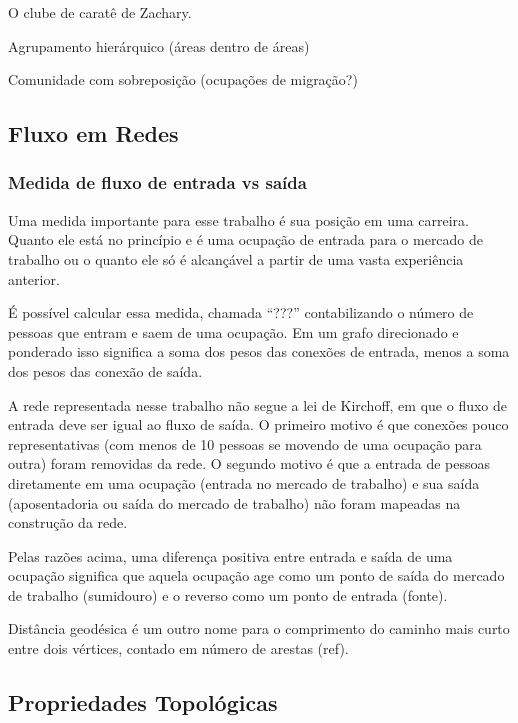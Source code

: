 \documentclass[12pt,a4paper]{article}
\theoremstyle{hypo}
\begin{document}
O clube de caratê de Zachary.

Agrupamento hierárquico (áreas dentro de áreas)

Comunidade com sobreposição (ocupações de migração?)


\subsection{Fluxo em Redes}

\subsubsection{Medida de fluxo de entrada vs saída}


Uma medida importante para esse trabalho é sua posição em uma carreira. Quanto ele está no princípio e é uma ocupação de entrada para o mercado de trabalho ou o quanto ele só é alcançável a partir de uma vasta experiência anterior.

É possível calcular essa medida, chamada \enquote{???} contabilizando o número de pessoas que entram e saem de uma ocupação. Em um grafo direcionado e ponderado isso significa a soma dos pesos das conexões de entrada, menos a soma dos pesos das conexão de saída.

A rede representada nesse trabalho não segue a lei de Kirchoff, em que o fluxo de entrada deve ser igual ao fluxo de saída. O primeiro motivo é que conexões pouco representativas (com menos de 10 pessoas se movendo de uma ocupação para outra) foram removidas da rede. O segundo motivo é que a entrada de pessoas diretamente em uma ocupação (entrada no mercado de trabalho) e sua saída (aposentadoria ou saída do mercado de trabalho) não foram mapeadas na construção da rede.

Pelas razões acima, uma diferença positiva entre entrada e saída de uma ocupação significa que aquela ocupação age como um ponto de saída do mercado de trabalho (sumidouro) e o reverso como um ponto de entrada (fonte).


Distância geodésica é um outro nome para o comprimento do caminho mais curto entre dois vértices, contado em número de arestas (ref).

\subsection{Propriedades Topológicas}
\end{document}
